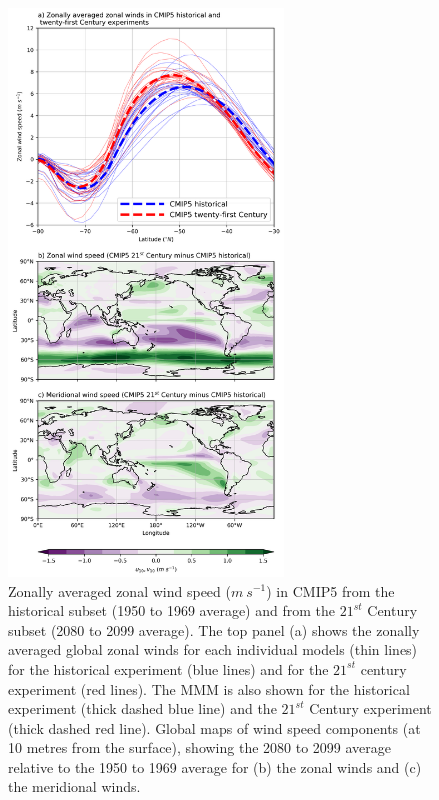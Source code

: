 \documentclass[draft,linenumbers]{agujournal2018}
\begin{document}
\begin{figure}[h]
\centering
\includegraphics[trim={0 0 0 0},clip,width=0.65\textwidth]{p27_fig2_.png}
\caption{Zonally averaged zonal wind speed ($m\ s^{-1}$) in CMIP5 from the historical subset (1950 to 1969 average) and from the $21^{st}$ Century subset (2080 to 2099 average). The top panel (a) shows the zonally averaged global zonal winds for each individual models (thin lines) for the historical experiment (blue lines) and for the $21^{st}$ century experiment (red lines). The MMM is also shown for the historical experiment (thick dashed blue line) and the $21^{st}$ Century experiment (thick dashed red line). Global maps of wind speed components (at 10 metres from the surface), showing the 2080 to 2099 average relative to the 1950 to 1969 average for (b) the zonal winds and (c) the meridional winds.}\label{p27_fig1_}
\end{figure}
\end{document}
